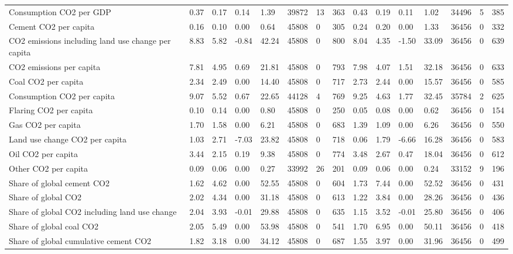 \begin{longtable}{lllllllllllllll}
\addlinespace
Consumption CO2 per GDP & 0.37 & 0.17 & 0.14 & 1.39 & 39872 & 13 & 363 & 0.43 & 0.19 & 0.11 & 1.02 & 34496 & 5 & 385\\
Cement CO2 per capita & 0.16 & 0.10 & 0.00 & 0.64 & 45808 & 0 & 305 & 0.24 & 0.20 & 0.00 & 1.33 & 36456 & 0 & 332\\
CO2 emissions including land use change per capita & 8.83 & 5.82 & -0.84 & 42.24 & 45808 & 0 & 800 & 8.04 & 4.35 & -1.50 & 33.09 & 36456 & 0 & 639\\
CO2 emissions per capita & 7.81 & 4.95 & 0.69 & 21.81 & 45808 & 0 & 793 & 7.98 & 4.07 & 1.51 & 32.18 & 36456 & 0 & 633\\
Coal CO2 per capita & 2.34 & 2.49 & 0.00 & 14.40 & 45808 & 0 & 717 & 2.73 & 2.44 & 0.00 & 15.57 & 36456 & 0 & 585\\
\addlinespace
Consumption CO2 per capita & 9.07 & 5.52 & 0.67 & 22.65 & 44128 & 4 & 769 & 9.25 & 4.63 & 1.77 & 32.45 & 35784 & 2 & 625\\
Flaring CO2 per capita & 0.10 & 0.14 & 0.00 & 0.80 & 45808 & 0 & 250 & 0.05 & 0.08 & 0.00 & 0.62 & 36456 & 0 & 154\\
Gas CO2 per capita & 1.70 & 1.58 & 0.00 & 6.21 & 45808 & 0 & 683 & 1.39 & 1.09 & 0.00 & 6.26 & 36456 & 0 & 550\\
Land use change CO2 per capita & 1.03 & 2.71 & -7.03 & 23.82 & 45808 & 0 & 718 & 0.06 & 1.79 & -6.66 & 16.28 & 36456 & 0 & 583\\
Oil CO2 per capita & 3.44 & 2.15 & 0.19 & 9.38 & 45808 & 0 & 774 & 3.48 & 2.67 & 0.47 & 18.04 & 36456 & 0 & 612\\
\addlinespace
Other CO2 per capita & 0.09 & 0.06 & 0.00 & 0.27 & 33992 & 26 & 201 & 0.09 & 0.06 & 0.00 & 0.24 & 33152 & 9 & 196\\
Share of global cement CO2 & 1.62 & 4.62 & 0.00 & 52.55 & 45808 & 0 & 604 & 1.73 & 7.44 & 0.00 & 52.52 & 36456 & 0 & 431\\
Share of global CO2 & 2.02 & 4.34 & 0.00 & 31.18 & 45808 & 0 & 613 & 1.22 & 3.84 & 0.00 & 28.26 & 36456 & 0 & 436\\
Share of global CO2 including land use change & 2.04 & 3.93 & -0.01 & 29.88 & 45808 & 0 & 635 & 1.15 & 3.52 & -0.01 & 25.80 & 36456 & 0 & 406\\
Share of global coal CO2 & 2.05 & 5.49 & 0.00 & 53.98 & 45808 & 0 & 541 & 1.70 & 6.95 & 0.00 & 50.11 & 36456 & 0 & 418\\
\addlinespace
Share of global cumulative cement CO2 & 1.82 & 3.18 & 0.00 & 34.12 & 45808 & 0 & 687 & 1.55 & 3.97 & 0.00 & 31.96 & 36456 & 0 & 499\\

\end{longtable}

